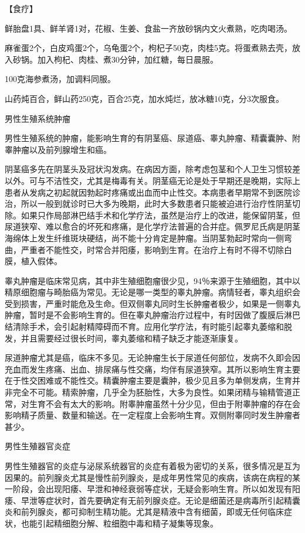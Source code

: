 \documentclass[12pt,UTF8]{ctexbook}
\begin{document}
【食疗】

鲜胎盘1具、鲜羊肾1对，花椒、生姜、食盐一齐放砂锅内文火煮熟，吃肉喝汤。

麻雀蛋2个，白皮鸡蛋2个，乌龟蛋2个，枸杞子50克，肉桂5克。将蛋煮熟去壳，放入砂锅。加入枸杞、肉桂、煮30分钟，加红糖，每日晨服。

100克海参煮汤，加调料同服。

山药炖百合，鲜山药250克，百合25克，加水炖烂，放冰糖10克，分3次服食。





男性生殖系统肿瘤


男性生殖系统的肿瘤，能影响生育的有阴茎癌、尿道癌、睾丸肿瘤、精囊囊肿、附睾肿瘤以及前列腺增生和癌。

阴茎癌多先在阴茎头及冠状沟发病。在病因方面，除考虑包茎和个人卫生习惯较差以外。可与不洁性交，尤其是梅毒有关。阴茎癌无论是处于早期还是晚期，实际上患者从发病之初起就因勃起时疼痛或出血而中止性交。本病患者早期常不到医院诊治，所以一般到就诊时已大多为晚期，此时大多数患者只能被迫进行治疗性阴茎切除。如果只作局部淋巴结手术和化学疗法，虽然是治疗上的改进，能保留阴茎，但尿道狭窄、难以愈合的坏死和疼痛，是化学疗法普遍的合并症。佩罗尼氏病是阴茎海绵体上发生纤维斑块硬结，尚不能十分肯定是肿瘤。当阴茎勃起时常向一侧弯曲，严重者不能性交，时常合并阳痿，影响到生育。在治疗上有时不得不切除白膜，植入假体。

睾丸肿瘤是临床常见病，其中非生殖细胞瘤很少见，94％来源于生殖细胞，其中以精原细胞瘤与畸胎癌为常见。无论是哪一类型的睾丸肿瘤。病情轻者，睾丸组织会受到损害，严重时能危及生命。但双侧睾丸同时生长肿瘤者极少，如果是一侧睾丸肿瘤，暂时是不会影响生育的。但在睾丸肿瘤治疗过程中，有时因做了腹膜后淋巴结清除手术，会引起射精障碍而不育。应用化学疗法，有时能引起睾丸萎缩和脱发，并且需要经过很长时间，睾丸萎缩和精子缺乏才能逐渐康复。

尿道肿瘤尤其是癌，临床不多见。无论肿瘤生长于尿道任何部位，发病不久即会因充血而发生疼痛、出血、排尿痛与性交痛，均伴有尿道狭窄。其所以影响生育主要在于性交困难或不能性交。精囊肿瘤主要是囊肿，极少见且多为单侧发病，生育并非完全不可能。精索肿瘤，几乎全为胚胎性，大多为良性。如果闭精与输精管道正常，对生育不会有太大的影响。附睾肿瘤虽然十分少见，但由于附睾肿瘤的存在会影响精子质量、数量和输送。在一定程度上会影响生育。双侧附睾同时发生肿瘤者甚少。





男性生殖器官炎症


男性生殖器官的炎症与泌尿系统器官的炎症有着极为密切的关系，很多情况是互为因果的。前列腺炎尤其是慢性前列腺炎，是成年男性常见的疾病，该病在病程的某一阶段，会出现阳痿、早泄和神经衰弱等症状，无疑会影响生育。所以如发现有阳痿、早泄等症状时，首先要确定有无前列腺炎症。无论是细菌还是病毒所引起精囊炎和前列腺炎，都可抑制生精功能。尤其是精液中含有细菌，即或无任何临床症状，也能引起精细胞分解、粒细胞中毒和精子凝集等现象。
\end{document}
